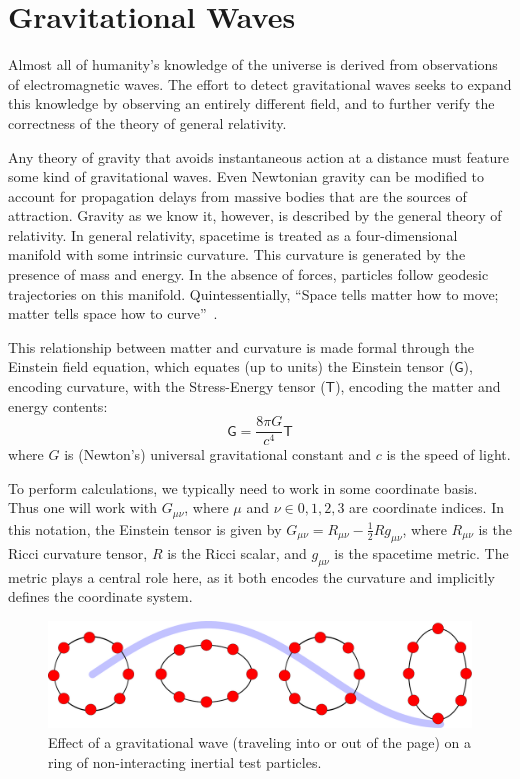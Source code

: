 \label{chapter1}

\section{Gravitational Waves}

Almost all of humanity's knowledge of the universe is derived from
observations of electromagnetic waves.  The effort to detect
gravitational waves seeks to expand this knowledge by observing an
entirely different field, and to further verify the correctness of the
theory of general relativity.

Any theory of gravity that avoids instantaneous action at a distance
must feature some kind of gravitational waves.  Even Newtonian gravity
can be modified to account for propagation delays from massive bodies
that are the sources of attraction\cite{Schutz1984Gravitational}.
Gravity as we know it, however, is described by the general theory of
relativity.  In general relativity, spacetime is treated as a
four-dimensional manifold with some intrinsic curvature.  This
curvature is generated by the presence of mass and energy.  In the
absence of forces, particles follow geodesic trajectories on this
manifold.  Quintessentially, ``Space tells matter how to move; matter
tells space how to curve''~\cite{MTW}.

This relationship between matter and curvature is made formal through
the Einstein field equation, which equates (up to units) the Einstein
tensor ($\mathsf{G}$), encoding curvature, with the
Stress-Energy tensor ($\mathsf{T}$), encoding the matter and energy
contents:
\begin{equation}
\mathsf{G} = \frac {8\pi G}{c^4} \mathsf{T}
\end{equation}
where $G$ is (Newton's) universal gravitational constant and $c$ is
the speed of light.

To perform calculations, we typically need to work in some coordinate
basis.  Thus one will work with $G_{\mu\nu}$, where $\mu$ and $\nu \in
{0,1,2,3}$ are coordinate indices.  In this notation, the Einstein
tensor is given by $G_{\mu\nu} = R_{\mu\nu} - \frac{1}{2} R
g_{\mu\nu}$, where $R_{\mu\nu}$ is the Ricci curvature tensor, $R$ is
the Ricci scalar, and $g_{\mu\nu}$ is the spacetime metric.  The
metric plays a central role here, as it both encodes the curvature and
implicitly defines the coordinate system.

\begin{figure}
\includegraphics[width=\columnwidth]{chapter1/figures/gwave.pdf}
\caption[Effect of a gravitational wave on a ring of test
  particles]{\label{fig:gwave-effect}Effect of a gravitational wave
  (traveling into or out of the page) on a ring of non-interacting
  inertial test particles.}
\end{figure}

